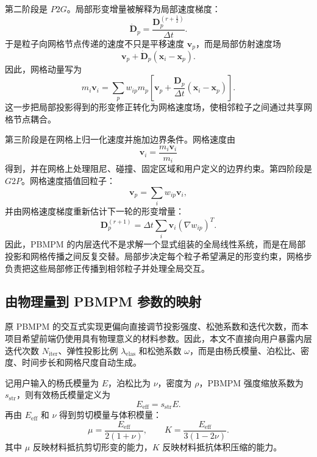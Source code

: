 \documentclass[a4paper]{article}
\begin{document}
第二阶段是 $P2G$。局部形变增量被解释为局部速度梯度：
\[
    \dot{\bm{D}}_p
    =
    \frac{
        \bm{D}_p^{(r+\frac{1}{2})}
    }{
        \Delta t
    }.
\]
于是粒子向网格节点传递的速度不只是平移速度 $\bm{v}_p$，而是局部仿射速度场
\[
    \bm{v}_p
    +
    \dot{\bm{D}}_p
    \left(
        \bm{x}_i-\bm{x}_p
    \right).
\]
因此，网格动量写为
\[
    m_i\bm{v}_i
    =
    \sum_p
    w_{ip}m_p
    \left[
        \bm{v}_p
        +
        \frac{\bm{D}_p}{\Delta t}
        \left(
            \bm{x}_i-\bm{x}_p
        \right)
    \right].
\]
这一步把局部投影得到的形变修正转化为网格速度场，使相邻粒子之间通过共享网格节点耦合。

第三阶段是在网格上归一化速度并施加边界条件。网格速度由
\[
    \bm{v}_i
    =
    \frac{
        m_i\bm{v}_i
    }{
        m_i
    }
\]
得到，并在网格上处理阻尼、碰撞、固定区域和用户定义的边界约束。第四阶段是 $G2P$。网格速度插值回粒子：
\[
    \bm{v}_p
    =
    \sum_i
    w_{ip}\bm{v}_i,
\]
并由网格速度梯度重新估计下一轮的形变增量：
\[
    \bm{D}_p^{(r+1)}
    =
    \Delta t
    \sum_i
    \bm{v}_i
    \left(
        \nabla w_{ip}
    \right)^T.
\]
因此，PBMPM 的内层迭代不是求解一个显式组装的全局线性系统，而是在局部投影和网格传播之间反复交替。局部步决定每个粒子希望满足的形变约束，网格步负责把这些局部修正传播到相邻粒子并处理全局交互。

\subsection{由物理量到 PBMPM 参数的映射}

原 PBMPM 的交互式实现更偏向直接调节投影强度、松弛系数和迭代次数，而本项目希望前端仍使用具有物理意义的材料参数。因此，本文不直接向用户暴露内层迭代次数 $N_{\mathrm{iter}}$、弹性投影比例 $\lambda_{\mathrm{elas}}$ 和松弛系数 $\omega$，而是由杨氏模量、泊松比、密度、时间步长和网格尺度自动生成。

记用户输入的杨氏模量为 $E$，泊松比为 $\nu$，密度为 $\rho$，PBMPM 强度缩放系数为 $s_{\mathrm{str}}$，则有效杨氏模量定义为
\[
    E_{\mathrm{eff}}
    =
    s_{\mathrm{str}}E.
\]
再由 $E_{\mathrm{eff}}$ 和 $\nu$ 得到剪切模量与体积模量：
\[
    \mu
    =
    \frac{
        E_{\mathrm{eff}}
    }{
        2(1+\nu)
    },
    \qquad
    K
    =
    \frac{
        E_{\mathrm{eff}}
    }{
        3(1-2\nu)
    }.
\]
其中 $\mu$ 反映材料抵抗剪切形变的能力，$K$ 反映材料抵抗体积压缩的能力。
\end{document}
